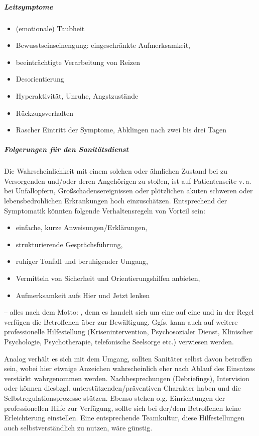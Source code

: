 {\subparagraph{Leitsymptome}
\begin{itemize}
  \item (emotionale) Taubheit
  \item Bewusstseinseinengung: eingeschränkte Aufmerksamkeit, \item beeinträchtigte Verarbeitung von Reizen
  \item Desorientierung
  \item Hyperaktivität, Unruhe, Angstzustände
  \item Rückzugsverhalten
  \item Rascher Eintritt der Symptome, Abklingen nach zwei bis drei Tagen
\end{itemize}
\subparagraph{Folgerungen für den Sanitätsdienst} Die
Wahrscheinlichkeit mit einem solchen oder ähnlichen Zustand
bei zu Versorgenden und/oder deren Angehörigen zu stoßen,
ist auf Patientenseite v.\,a. bei Unfallopfern,
Großschadensereignissen oder plötzlichen akuten
schweren oder lebensbedrohlichen Erkrankungen hoch einzuschätzen.
Entsprechend der  Symptomatik könnten folgende
Verhaltensregeln von Vorteil sein: 
\begin{itemize}
  \item einfache, kurze
  Anweisungen/Erklärungen,
  \item strukturierende Gesprächsführung,
  \item ruhiger Tonfall und beruhigender Umgang,
  \item Vermitteln von
  Sicherheit und Orientierungshilfen anbieten,
  \item Aufmerksamkeit
  aufs Hier und Jetzt lenken
\end{itemize}
-- alles nach dem Motto: , denn es handelt sich um eine  auf eine  und in der Regel
verfügen die Betroffenen über 
zur Bewältigung. Ggfs. kann auch auf weitere
professionelle Hilfestellung (Krisenintervention,
Psychosozialer Dienst, Klinischer Psychologie,
Psychotherapie, telefonische Seelsorge etc.) verwiesen werden.

Analog verhält es sich mit dem Umgang, sollten Sanitäter
selbst davon betroffen sein, wobei hier etwaige Anzeichen
wahrscheinlich eher nach Ablauf des Einsatzes verstärkt
wahrgenommen werden. Nachbesprechungen (Debriefings),
Intervision oder  können diesbzgl.
unterstützenden/präventiven Charakter haben und die
Selbstregulationsprozesse stützen. Ebenso stehen o.g.
Einrichtungen der professionellen Hilfe zur Verfügung,
sollte sich bei der/dem Betroffenen keine Erleichterung
einstellen. Eine entsprechende Teamkultur, diese
Hilfestellungen auch selbstverständlich zu nutzen, wäre
günstig.
}
{}
{}
{}
{}



